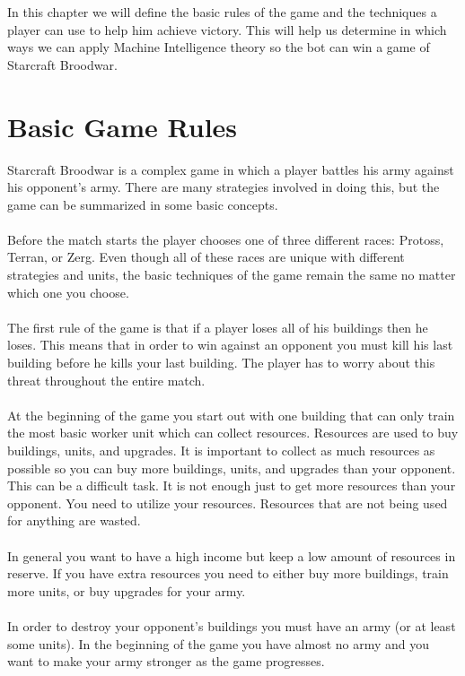 In this chapter we will define the basic rules of the game and the techniques a player can use to help him achieve victory.
This will help us determine in which ways we can apply Machine Intelligence theory so the bot can win a game of Starcraft Broodwar. 

\section{Basic Game Rules}
	Starcraft Broodwar is a complex game in which a player battles his army against his opponent's army. 
	There are many strategies involved in doing this, but the game can be summarized in some basic concepts.
\\
\\
	Before the match starts the player chooses one of three different races: Protoss, Terran, or Zerg. 
	Even though all of these races are unique with different strategies and units, 
	the basic techniques of the game remain the same no matter which one you choose.
\\
\\	
	The first rule of the game is that if a player loses all of his buildings then he loses. 
	This means that in order to win against an opponent you must kill his last building before he kills your last building. The player has to worry about this threat throughout the entire match.
\\
\\	
	At the beginning of the game you start out with one building that can only train the most basic worker unit which can collect resources. 
	Resources are used to buy buildings, units, and upgrades. 
	It is important to collect as much resources as possible so you can buy more buildings, units, and upgrades than your opponent.
	This can be a difficult task. It is not enough just to get more resources than your opponent. 
	You need to utilize your resources. Resources that are not being used for anything are wasted.
\\
\\ 
	In general you want to have a high income but keep a low amount of resources in reserve. 
	If you have extra resources you need to either buy more buildings, train more units, or buy upgrades for your army.\\
\\
	In order to destroy your opponent's buildings you must have an army (or at least some units). 
	In the beginning of the game you have almost no army and you want to make your army stronger as the game progresses. 
